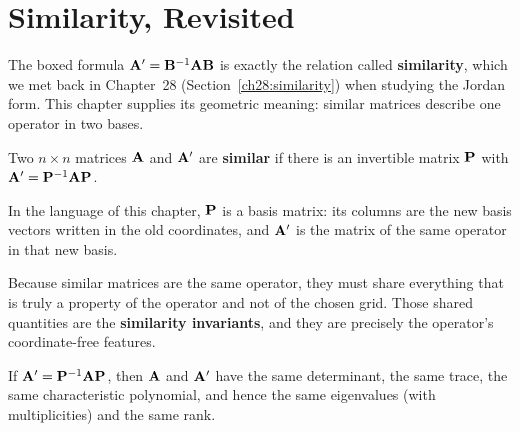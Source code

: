 \section{Similarity, Revisited}
\label{ch31:similarity}

The boxed formula $\mathbf{A}'=\mathbf{B}^{-1}\mathbf{A}\mathbf{B}$ is exactly the relation
called \textbf{similarity}, which we met back in Chapter~28 (Section~\ref{ch28:similarity}) when studying the Jordan form. This chapter supplies its geometric meaning: similar matrices describe one operator in two bases.

\begin{definition}
\label{ch31:def-similar}
Two $n\times n$ matrices $\mathbf{A}$ and $\mathbf{A}'$ are \textbf{similar} if there is
an invertible matrix $\mathbf{P}$ with $\mathbf{A}'=\mathbf{P}^{-1}\mathbf{A}\mathbf{P}$.
\end{definition}

\begin{aestheticbox}
In the language of this chapter, $\mathbf{P}$ is a basis matrix: its columns are
the new basis vectors written in the old coordinates, and $\mathbf{A}'$ is the
matrix of the same operator in that new basis.
\end{aestheticbox}

Because similar matrices are the same operator, they must share everything that is
truly a property of the operator and not of the chosen grid. Those shared
quantities are the \textbf{similarity invariants}, and they are precisely the
operator's coordinate-free features.

\begin{theorem}
\label{ch31:thm-invariants}
If $\mathbf{A}'=\mathbf{P}^{-1}\mathbf{A}\mathbf{P}$, then $\mathbf{A}$ and $\mathbf{A}'$ have the
same determinant, the same trace, the same characteristic polynomial, and hence
the same eigenvalues (with multiplicities) and the same rank.
\end{theorem}

